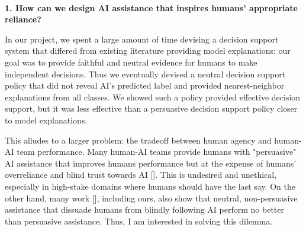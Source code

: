 

\noindent \textbf{\\1. How can we design AI assistance that inspires humans' appropriate reliance?}


In our project, we spent a large amount of time devising a decision support system that differed from existing literature providing model explanations: our goal was to provide faithful and neutral evidence for humans to make independent decisions. Thus we eventually devised a neutral decision support policy that did not reveal AI's predicted label and provided nearest-neighbor explanations from all classes. 
We showed such a policy provided effective decision support, but it was less effective than a persuasive decision support policy closer to model explanations. 

This alludes to a larger problem: the tradeoff between human agency and human-AI team performance. 
Many human-AI teams provide humans with "persuasive" AI assistance that improves humans performance but at the expense of humans' overreliance and blind trust towards AI []. This is undesired and unethical, especially in high-stake domains where humans should have the last say.
On the other hand, many work [], including ours, also show that neutral, non-persuasive assistance that dissuade humans from blindly following AI perform no better than persuasive assistance. 
Thus, I am interested in solving this dilemma.

